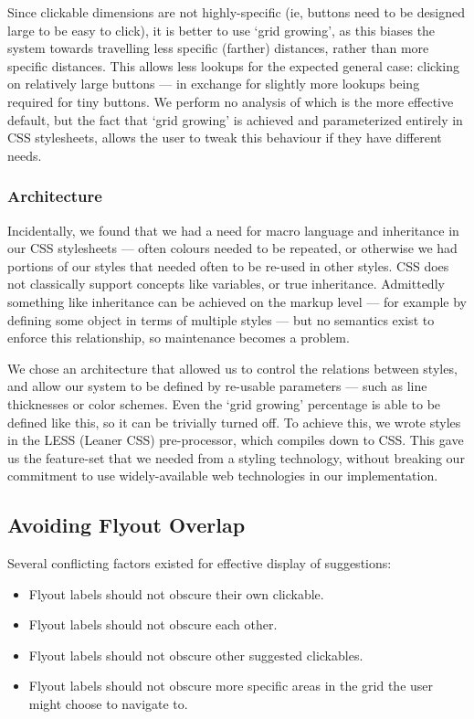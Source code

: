 \documentclass[11pt,openright,a4paper]{report}
\begin{document}
Since clickable dimensions are not highly-specific (ie, buttons need to be designed large to be easy to click), it is better to use `grid growing', as this biases the system towards travelling less specific (farther) distances, rather than more specific distances. This allows less lookups for the expected general case: clicking on relatively large buttons --- in exchange for slightly more lookups being required for tiny buttons. We perform no analysis of which is the more effective default, but the fact that `grid growing' is achieved and parameterized entirely in CSS stylesheets, allows the user to tweak this behaviour if they have different needs.

\subsubsection{Architecture}
Incidentally, we found that we had a need for macro language and inheritance in our CSS stylesheets --- often colours needed to be repeated, or otherwise we had portions of our styles that needed often to be re-used in other styles. CSS does not classically support concepts like variables, or true inheritance. Admittedly something like inheritance can be achieved on the markup level --- for example by defining some object in terms of multiple styles --- but no semantics exist to enforce this relationship, so maintenance becomes a problem.

We chose an architecture that allowed us to control the relations between styles, and allow our system to be defined by re-usable parameters --- such as line thicknesses or color schemes. Even the `grid growing' percentage is able to be defined like this, so it can be trivially turned off. To achieve this, we wrote styles in the LESS (Leaner CSS)\cite{lesscss} pre-processor, which compiles down to CSS. This gave us the feature-set that we needed from a styling technology, without breaking our commitment to use widely-available web technologies in our implementation.

\subsection{Avoiding Flyout Overlap}
\label{sec:avoidance}
Several conflicting factors existed for effective display of suggestions:

\begin{itemize}
\item Flyout labels should not obscure their own clickable.
\item Flyout labels should not obscure each other.
\item Flyout labels should not obscure other suggested clickables.
\item Flyout labels should not obscure more specific areas in the grid the user might choose to navigate to.
\end{itemize}
\end{document}
